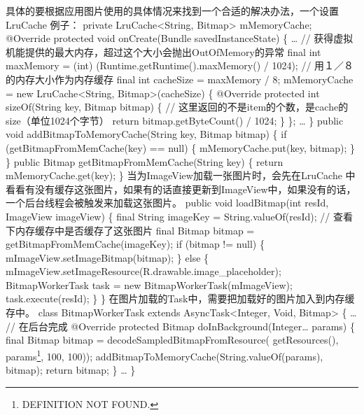 \documentclass[9pt, b5paper]{article}
\begin{document}
具体的要根据应用图片使用的具体情况来找到一个合适的解决办法，一个设置 LruCache 例子：
private LruCache<String, Bitmap> mMemoryCache;
@Override
protected void onCreate(Bundle savedInstanceState) \{
    \ldots{}
    // 获得虚拟机能提供的最大内存，超过这个大小会抛出OutOfMemory的异常
    final int maxMemory = (int) (Runtime.getRuntime().maxMemory() / 1024);
    // 用１／８的内存大小作为内存缓存
    final int cacheSize = maxMemory / 8;
    mMemoryCache = new LruCache<String, Bitmap>(cacheSize) \{
        @Override
        protected int sizeOf(String key, Bitmap bitmap) \{
            // 这里返回的不是item的个数，是cache的size（单位1024个字节）
            return bitmap.getByteCount() / 1024;
        \}
    \};
    \ldots{}
\}
public void addBitmapToMemoryCache(String key, Bitmap bitmap) \{
    if (getBitmapFromMemCache(key) == null) \{
        mMemoryCache.put(key, bitmap);
    \}
\}
public Bitmap getBitmapFromMemCache(String key) \{
    return mMemoryCache.get(key);
\}
当为ImageView加载一张图片时，会先在LruCache 中看看有没有缓存这张图片，如果有的话直接更新到ImageView中，如果没有的话，一个后台线程会被触发来加载这张图片。
public void loadBitmap(int resId, ImageView imageView) \{
    final String imageKey = String.valueOf(resId);
    // 查看下内存缓存中是否缓存了这张图片
    final Bitmap bitmap = getBitmapFromMemCache(imageKey);
    if (bitmap != null) \{
        mImageView.setImageBitmap(bitmap);
    \} else \{
        mImageView.setImageResource(R.drawable.image\_placeholder);
BitmapWorkerTask task = new BitmapWorkerTask(mImageView);
        task.execute(resId);
    \}
\}
   在图片加载的Task中，需要把加载好的图片加入到内存缓存中。
class BitmapWorkerTask extends AsyncTask<Integer, Void, Bitmap> \{
    \ldots{}
    // 在后台完成
    @Override
    protected Bitmap doInBackground(Integer\ldots{} params) \{
        final Bitmap bitmap = decodeSampledBitmapFromResource(
                getResources(), params\footnote{DEFINITION NOT FOUND.}, 100, 100));
    addBitmapToMemoryCache(String.valueOf(params\footnotemark[2]{}), bitmap);
        return bitmap;
    \}
    \ldots{}
\}
\end{document}
